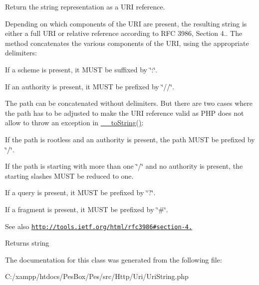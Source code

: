 Return the string representation as a U\+RI reference.

Depending on which components of the U\+RI are present, the resulting string is either a full U\+RI or relative reference according to R\+FC 3986, Section 4.. The method concatenates the various components of the U\+RI, using the appropriate delimiters\+:


\begin{DoxyItemize}
\item If a scheme is present, it M\+U\+ST be suffixed by \char`\"{}\+:\char`\"{}.
\item If an authority is present, it M\+U\+ST be prefixed by \char`\"{}//\char`\"{}.
\item The path can be concatenated without delimiters. But there are two cases where the path has to be adjusted to make the U\+RI reference valid as P\+HP does not allow to throw an exception in \mbox{\hyperlink{class_pes_1_1_http_1_1_uri_a7516ca30af0db3cdbf9a7739b48ce91d}{\+\_\+\+\_\+to\+String()}}\+:
\begin{DoxyItemize}
\item If the path is rootless and an authority is present, the path M\+U\+ST be prefixed by \char`\"{}/\char`\"{}.
\item If the path is starting with more than one \char`\"{}/\char`\"{} and no authority is present, the starting slashes M\+U\+ST be reduced to one.
\end{DoxyItemize}
\item If a query is present, it M\+U\+ST be prefixed by \char`\"{}?\char`\"{}.
\item If a fragment is present, it M\+U\+ST be prefixed by \char`\"{}\#\char`\"{}.
\end{DoxyItemize}

\begin{DoxySeeAlso}{See also}
\href{http://tools.ietf.org/html/rfc3986#section-4.1}{\tt http\+://tools.\+ietf.\+org/html/rfc3986\#section-\/4.} 
\end{DoxySeeAlso}
\begin{DoxyReturn}{Returns}
string 
\end{DoxyReturn}


The documentation for this class was generated from the following file\+:\begin{DoxyCompactItemize}
\item 
C\+:/xampp/htdocs/\+Pes\+Box/\+Pes/src/\+Http/\+Uri/Uri\+String.\+php\end{DoxyCompactItemize}
